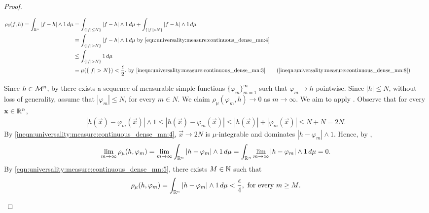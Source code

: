 \begin{proof}
\begin{step}
\begin{subequations}
\begin{align*}
    \rho_\delta(f, h) = \int_{\R^n} |f - h | \wedge 1 \, d\mu &= \int_{\{ |f| \leq N \}} |f - h | \wedge 1 \, d\mu +  \int_{\{ |f| > N \}} |f - h | \wedge 1 \, d\mu & \quad \\
    &= \int_{\{ |f| > N \}} |f - h | \wedge 1 \, d\mu  \text{ by \ref{eqn:universality:measure:continuous_dense_mn:4} } &\\
    &\leq \int_{\{ |f| > N \}} 1 \, d\mu &  \quad & \\
    &=\mu(\{ |f| > N \}) < \frac{\epsilon}{2}.  \text{ by \ref{ineqn:universality:measure:continuous_dense_mn:3}}
     \tag{\ref{ineqn:universality:measure:continuous_dense_mn:8}} 
\end{align*}
\end{subequations}
\end{step}
\begin{step}
Since $h \in {\mathcal M}^n$, by there exists a sequence of measurable simple functions $\{ \varphi_m \}_{m=1}^\infty$ such that $\varphi_m \to h$ pointwise. Since $|h| \leq N$, without loss of generality, assume that $|\varphi_m| \leq N$, for every $m \in N$. We claim $\rho_\mu(\varphi_m, h) \to 0$ as $m \to \infty$. We aim to apply . Observe that for every $\mathbf{x} \in {\mathbb R}^n$, \begin{align}
    \label{ineqn:universality:measure:continuous_dense_mn:4}
     | h(\vec{x}) - \varphi_m(\vec{x}) | \wedge 1 \leq | h(\vec{x}) -  \varphi_m(\vec{x}) | \leq  | h(\vec{x})| +  |  \varphi_m (\vec{x}) | \leq N + N = 2N.
\end{align}
By \ref{ineqn:universality:measure:continuous_dense_mn:4}, $\vec{x} \to 2N$ is $\mu$-integrable and dominates $|h - \varphi_m| \wedge 1$. Hence, by , \begin{align}
     \label{eqn:universality:measure:continuous_dense_mn:5}
     \lim_{m \to \infty} \rho_\mu (h, \varphi_m) = \lim_{m \to \infty} \int_{{\mathbb R}^n} | h  -  \varphi_m | \wedge 1 \, d\mu =  \int_{{\mathbb R}^n} \lim_{m \to \infty} | h  -  \varphi_m | \wedge 1 \, d\mu = 0.
\end{align}
By \ref{eqn:universality:measure:continuous_dense_mn:5}, there exists $M \in {\mathbb N}$ such that \begin{align}
    \label{ineqn:universality:measure:continuous_dense_mn:6}
    \rho_\mu(h, \varphi_m) = \int_{{\mathbb R}^n} | h  -  \varphi_m | \wedge 1 \, d\mu < \frac{\epsilon}{4}, \text{ for every $m \geq M$}.
\end{align}

\end{step}
\end{proof}
